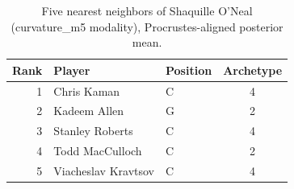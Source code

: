 \begin{table}[htbp]
  \centering\small
  \begin{tabular}{rllc}
    \toprule
    Rank & Player & Position & Archetype \\
    \midrule
    1 & Chris Kaman & C & 4 \\
    2 & Kadeem Allen & G & 2 \\
    3 & Stanley Roberts & C & 4 \\
    4 & Todd MacCulloch & C & 2 \\
    5 & Viacheslav Kravtsov & C & 4 \\
    \bottomrule
  \end{tabular}
  \caption{Five nearest neighbors of Shaquille O'Neal (curvature_m5 modality), Procrustes-aligned posterior mean.}
  \label{tab:Shaquille_O_Neal_neighbors_curvature_m5}
\end{table}

